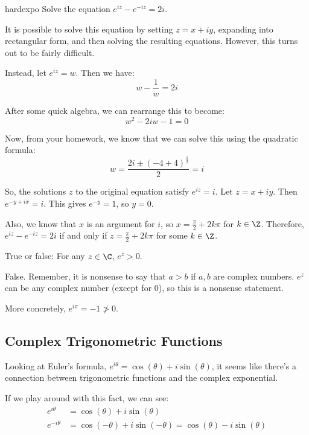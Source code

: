 \begin{ex}{}{hardexpo} Solve the equation $e^{iz} - e^{-iz} = 2i$.

It is possible to solve this equation by setting $z = x+ iy$, expanding into rectangular form, and then solving the resulting equations. However, this turns out to be fairly difficult.

Instead, let $e^{iz} = w$. Then we have:
$$w - \frac{1}{w} = 2i$$

After some quick algebra, we can rearrange this to become:
$$w^2 - 2iw - 1 = 0$$

Now, from your homework, we know that we can solve this using the quadratic formula:
$$w = \frac{2i \pm (-4 + 4)^{\frac{1}{2}}}{2} = i$$

So, the solutions $z$ to the original equation satisfy $e^{iz} = i$. Let $z = x+iy$. Then $e^{-y + ix} = i$. This gives $e^{-y} = 1$, so $y = 0$.

Also, we know that $x$ is an argument for $i$, so $x = \frac{\pi}{2} + 2k\pi$ for $k\in \Z$. Therefore, $e^{iz} - e^{-iz} = 2i$ if and only if $z = \frac{\pi}{2} + 2k\pi$ for some $k\in \Z$.

\end{ex}


\begin{ex}{}{} True or false: For any $z\in \C$, $e^z > 0$.

False. Remember, it is nonsense to say that $a > b$ if $a,b$ are complex numbers. $e^z$ can be any complex number (except for $0$), so this is a nonsense statement.

More concretely, $e^{i\pi} = -1 \not> 0$.

\end{ex}

\subsection{Complex Trigonometric Functions}

Looking at Euler's formula, $e^{i\theta} = \cos(\theta) + i\sin(\theta)$, it seems like there's a connection between trigonometric functions and the complex exponential.

If we play around with this fact, we can see:
\begin{align*}
e^{i\theta} &= \cos(\theta) + i\sin(\theta)\\
e^{-i\theta} &= \cos(-\theta) + i\sin(-\theta) = \cos(\theta) - i\sin(\theta)
\end{align*}

